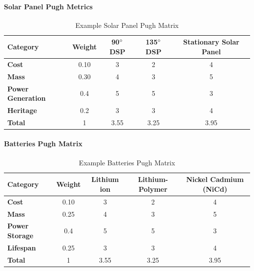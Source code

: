 \paragraph{Solar Panel Pugh Metrics}
\begin{table}[H]
\centering
\begin{tabular}{|l|c|c|c|c|} 
\hline
    \textbf{Category} & \textbf{Weight} & \textbf{90$\degree$ DSP} & \textbf{135$\degree$ DSP} & \textbf{Stationary Solar Panel}
    \\
\hline
    \textbf{Cost} & 0.10 & 3 & 2 & 4
    \\
\hline
    \textbf{Mass} & 0.30 & 4 & 3 & 5
    \\
\hline
    \textbf{Power Generation} & 0.4 & 5 & 5 & 3
    \\
\hline
    \textbf{Heritage} & 0.2 & 3 & 3 & 4
    \\
\hline
    \textbf{Total} & 1 & 3.55 & 3.25 & 3.95
    \\
\hline
\end{tabular}
\caption{Example Solar Panel Pugh Matrix }
\label{tbl:SolarPanel_Pugh}
\end{table}
\paragraph{Batteries Pugh Matrix}
\begin{table}[H]
\centering
\begin{tabular}{|l|c|c|c|c|} 
\hline
    \textbf{Category} & \textbf{Weight} & \textbf{Lithium ion} & \textbf{Lithium-Polymer} & \textbf{Nickel Cadmium (NiCd)}
    \\
\hline
    \textbf{Cost} & 0.10 & 3 & 2 & 4
    \\
\hline
    \textbf{Mass} & 0.25 & 4 & 3 & 5
    \\
\hline
    \textbf{Power Storage} & 0.4 & 5 & 5 & 3
    \\
\hline
    \textbf{Lifespan} & 0.25 & 3 & 3 & 4
    \\
\hline
    \textbf{Total} & 1 & 3.55 & 3.25 & 3.95
    \\
\hline
\end{tabular}
\caption{Example Batteries Pugh Matrix }
\label{tbl:Batteries_Pugh}
\end{table}

